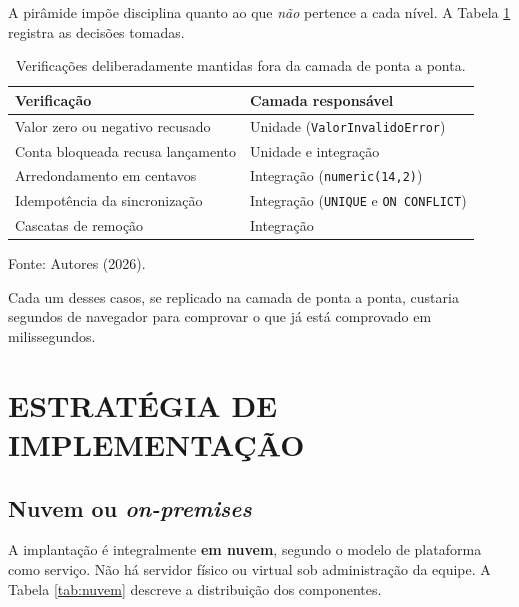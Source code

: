\documentclass[12pt,a4paper]{article}
\begin{document}
A pirâmide impõe disciplina quanto ao que \textit{não} pertence a cada nível. A Tabela \ref{tab:naoentra} registra as decisões tomadas.

\begin{table}[H]
\centering
\caption{Verificações deliberadamente mantidas fora da camada de ponta a ponta.}
\label{tab:naoentra}
\renewcommand{\arraystretch}{1.4}
\begin{tabularx}{\textwidth}{@{}>{\RaggedRight}p{6cm}>{\RaggedRight\arraybackslash}X@{}}
\toprule
\textbf{Verificação} & \textbf{Camada responsável} \\
\midrule
Valor zero ou negativo recusado & Unidade (\texttt{ValorInvalidoError}) \\
Conta bloqueada recusa lançamento & Unidade e integração \\
Arredondamento em centavos & Integração (\texttt{numeric(14,2)}) \\
Idempotência da sincronização & Integração (\texttt{UNIQUE} e \texttt{ON CONFLICT}) \\
Cascatas de remoção & Integração \\
\bottomrule
\end{tabularx}
\vspace{0.3cm}

\noindent\footnotesize Fonte: Autores (2026).
\end{table}

Cada um desses casos, se replicado na camada de ponta a ponta, custaria segundos de navegador para comprovar o que já está comprovado em milissegundos.

\section{ESTRATÉGIA DE IMPLEMENTAÇÃO}

\subsection{Nuvem ou \textit{on-premises}}

A implantação é integralmente \textbf{em nuvem}, segundo o modelo de plataforma como serviço. Não há servidor físico ou virtual sob administração da equipe. A Tabela \ref{tab:nuvem} descreve a distribuição dos componentes.
\end{document}
